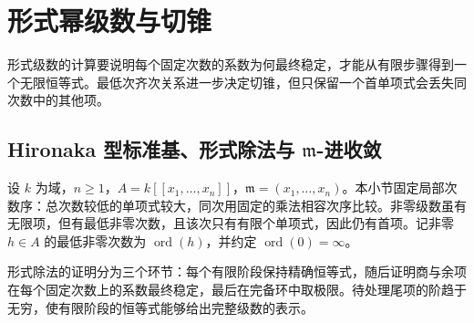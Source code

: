 
\section{形式幂级数与切锥}
\label{b3:sec:F03}

形式级数的计算要说明每个固定次数的系数为何最终稳定，才能从有限步骤得到一个无限恒等式。最低次齐次关系进一步决定切锥，但只保留一个首单项式会丢失同次数中的其他项。


\subsection{Hironaka 型标准基、形式除法与 \texorpdfstring{\(\mathfrak m\)}{m}-进收敛}
\label{b3:subsec:F03:01}

设 \(k\) 为域，\(n\ge1\)，\(A=k[\![x_1,\ldots,x_n]\!]\)，\(\mathfrak m=(x_1,\ldots,x_n)\)。本小节固定局部次数序：总次数较低的单项式较大，同次用固定的乘法相容次序比较。非零级数虽有无限项，但有最低非零次数，且该次只有有限个单项式，因此仍有首项。记非零 \(h\in A\) 的最低非零次数为 \(\operatorname{ord}(h)\)，并约定 \(\operatorname{ord}(0)=\infty\)。

\ProseParagraphBreak
形式除法的证明分为三个环节：每个有限阶段保持精确恒等式，随后证明商与余项在每个固定次数上的系数最终稳定，最后在完备环中取极限。待处理尾项的阶趋于无穷，使有限阶段的恒等式能够给出完整级数的表示。

